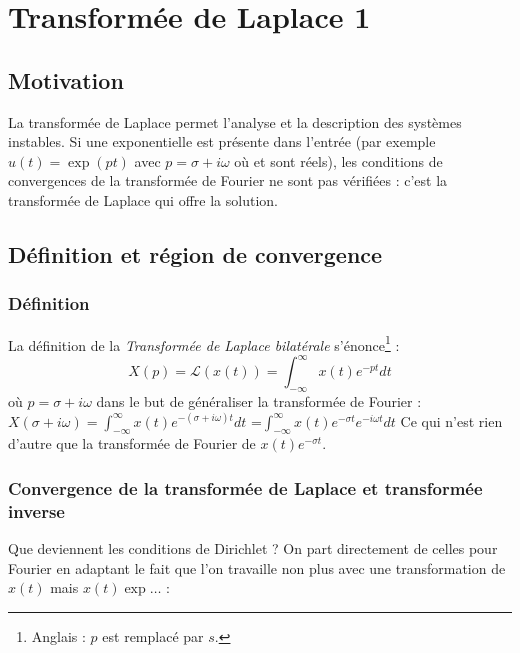 \chapter{Transformée de Laplace 1}
\section{Motivation}
La transformée de Laplace permet l'analyse et la description des systèmes instables.
Si une exponentielle est présente dans l'entrée (par exemple $u(t) = \exp(pt)$ avec
$p = \sigma + i\omega$ où \sigma et \omega sont réels), les
conditions de convergences de la transformée de Fourier ne sont pas vérifiées : c'est
la transformée de Laplace qui offre la solution.


\section{Définition et région de convergence}
	\subsection{Définition}
	La définition de la \textit{Transformée de Laplace bilatérale} s'énonce\footnote{
	Anglais : $p$ est remplacé par $s$.} :
	\begin{equation}
	X(p) = \mathcal{L}(x(t)) = \int_{-\infty}^\infty x(t)e^{-pt}dt
	\end{equation}
	où $p= \sigma + i\omega$ dans le but de généraliser la transformée de Fourier :
$	X(\sigma+i\omega) = \int_{-\infty}^\infty x(t)e^{-(\sigma+i\omega)t}dt$ =$ 
	\int_{-\infty}^\infty x(t)e^{-\sigma t}e^{-i\omega t}dt
$%
	 Ce qui n'est rien d'autre que la transformée de Fourier de $x(t)e^{-\sigma t}$.


	\subsection{Convergence de la transformée de Laplace et transformée inverse}
	Que deviennent les conditions de Dirichlet ? On part directement de celles pour
	Fourier en adaptant le fait que l'on travaille non plus avec une transformation 
	de $x(t)$ mais $x(t)\exp\dots$ :
	
